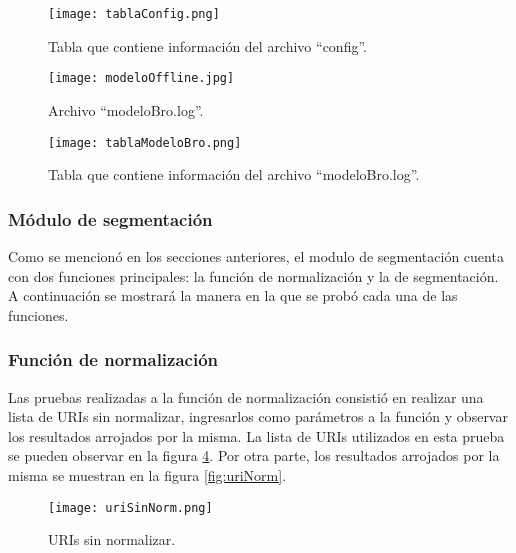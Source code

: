 \begin{figure}[tb]
\begin{center}
\texttt{[image: tablaConfig.png]}
\caption{Tabla que contiene información del archivo ``config''.}
\label{fig:configResult}
\end{center}
\end{figure}

\begin{figure}[tb]
\begin{center}
\texttt{[image: modeloOffline.jpg]}
\caption{Archivo ``modeloBro.log''.}
\label{fig:modelFile}
\end{center}
\end{figure}

\begin{figure}[tb]
\begin{center}
\texttt{[image: tablaModeloBro.png]}
\caption{Tabla que contiene información del archivo ``modeloBro.log''.}
\label{fig:modelResult}
\end{center}
\end{figure}

\subsubsection{Módulo de segmentación}

Como se mencionó en los secciones anteriores, el modulo de segmentación
cuenta con dos funciones principales: la función de normalización y la de
segmentación. A continuación se mostrará la manera en la que se probó cada una de las funciones.

\subsubsection*{Función de normalización}

Las pruebas realizadas a la función de normalización consistió en realizar una lista de URIs sin normalizar, ingresarlos como parámetros a la función y observar los resultados arrojados por la misma.
La lista de URIs utilizados en esta prueba se pueden observar en la figura \ref{fig:uriSinNorm}. Por otra parte, los resultados arrojados por la misma se muestran en la
figura \ref{fig:uriNorm}.

\begin{figure}[tb]
\begin{center}
\texttt{[image: uriSinNorm.png]}
\caption{URIs sin normalizar.}
\label{fig:uriSinNorm}
\end{center}
\end{figure}

